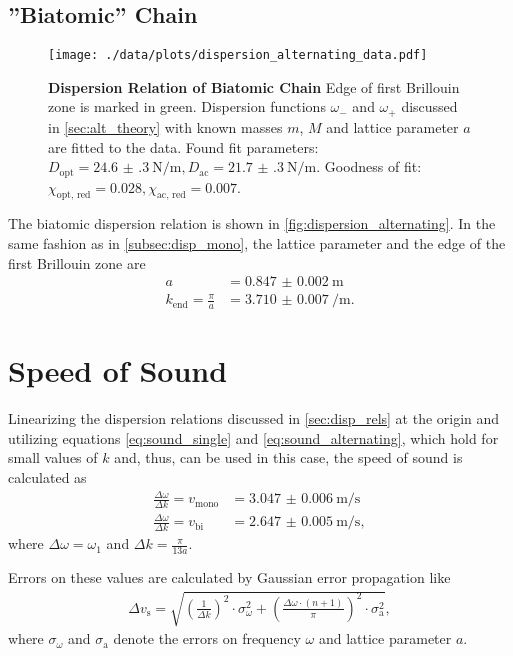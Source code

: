 \subsection{''Biatomic'' Chain}
\begin{figure}
	\centering
	\texttt{[image: ./data/plots/dispersion\_alternating\_data.pdf]}
	\caption[Dispersion Relation of Biatomic Chain]{\textbf{Dispersion Relation of Biatomic Chain} Edge of first Brillouin zone is marked in green.
	Dispersion functions $\omega_{-}$ and $\omega_{+}$ discussed in \autoref{sec:alt_theory} with known masses $m$, $M$ and lattice parameter $a$ are fitted to the data.
	Found fit parameters: $D_\text{opt}=\SI{24.6(3)}{\newton\per\meter}, D_\text{ac}=\SI{21.7(3)}{\newton\per\meter}$. Goodness of fit: $\chi_\text{opt, red}=\num{0.028}, \chi_\text{ac, red}=\num{0.007}$.}
	\label{fig:dispersion_single}
\end{figure}
The biatomic dispersion relation is shown in \autoref{fig:dispersion_alternating}.
In the same fashion as in \autoref{subsec:disp_mono}, the lattice parameter and the edge of the first Brillouin zone are
\begin{align*}
	a &= \SI{0.847(2)}{\meter} \\
	k_\text{end} = \frac{\pi}{a} &= \SI{3.710(7)}{\per\meter}.
\end{align*}

\section{Speed of Sound}
Linearizing the dispersion relations discussed in \autoref{sec:disp_rels} at the origin
and utilizing equations \ref{eq:sound_single} and \ref{eq:sound_alternating}, which hold for small values of $k$ and, thus, can be used in this case,
the speed of sound is calculated as
\begin{align*}
	\frac{\Delta\omega}{\Delta k} = v_\text{mono} &= \SI{3.047(6)}{\meter\per\second} \\
	\frac{\Delta\omega}{\Delta k} = v_\text{bi} &= \SI{2.647(5)}{\meter\per\second},
\end{align*}
where $\Delta\omega = \omega_1$ and $\Delta k = \frac{\pi}{13a}$.

Errors on these values are calculated by Gaussian error propagation like
\begin{align*}
	\Delta v_\text{s} = \sqrt{\left(\frac{1}{\Delta k}\right)^2 \cdot \sigma_\omega^2 + \left(\frac{\Delta\omega\cdot (n+1)}{\pi}\right)^2 \cdot \sigma_\text{a}^2},
\end{align*}
where $\sigma_\omega$ and $\sigma_\text{a}$ denote the errors on frequency $\omega$ and lattice parameter $a$.

